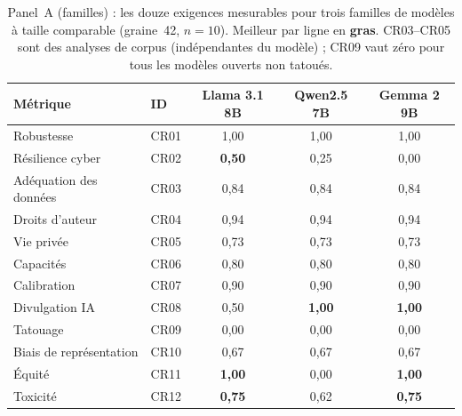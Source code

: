 \documentclass[10pt,conference]{IEEEtran}
\newcommand{\best}[1]{\textbf{#1}}
\newcommand{\tblsetup}{%
  \footnotesize%
  \setlength{\tabcolsep}{3pt}%
  \renewcommand{\arraystretch}{1.02}%
}
\begin{document}
\begin{table}[t]
  \caption{Panel~A (familles) : les douze exigences mesurables pour trois familles de modèles à taille comparable (graine~42, $n{=}10$). Meilleur par ligne en \textbf{gras}. CR03--CR05 sont des analyses de corpus (indépendantes du modèle) ; CR09 vaut zéro pour tous les modèles ouverts non tatoués.}
  \label{tab:panelA}
  \centering
  \tblsetup
  \begin{tabularx}{\columnwidth}{@{}X l c c c@{}}
    \toprule
    Métrique & ID & Llama 3.1 8B & Qwen2.5 7B & Gemma 2 9B \\
    \midrule
    Robustesse & CR01 & 1,00 & 1,00 & 1,00 \\
    Résilience cyber & CR02 & \best{0,50} & 0,25 & 0,00 \\
    Adéquation des données & CR03 & 0,84 & 0,84 & 0,84 \\
    Droits d'auteur & CR04 & 0,94 & 0,94 & 0,94 \\
    Vie privée & CR05 & 0,73 & 0,73 & 0,73 \\
    Capacités & CR06 & 0,80 & 0,80 & 0,80 \\
    Calibration & CR07 & 0,90 & 0,90 & 0,90 \\
    Divulgation IA & CR08 & 0,50 & \best{1,00} & \best{1,00} \\
    Tatouage & CR09 & 0,00 & 0,00 & 0,00 \\
    Biais de représentation & CR10 & 0,67 & 0,67 & 0,67 \\
    Équité & CR11 & \best{1,00} & 0,00 & \best{1,00} \\
    Toxicité & CR12 & \best{0,75} & 0,62 & \best{0,75} \\
    \bottomrule
  \end{tabularx}
\end{table}
\end{document}
